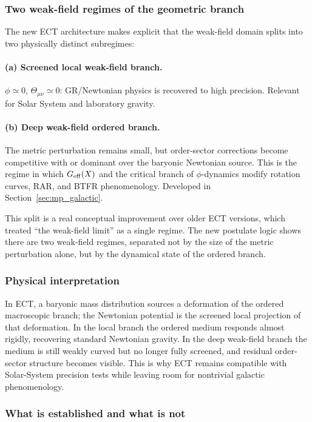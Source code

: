 \documentclass[11pt,a4paper]{article}
\numberwithin{equation}{section}
\begin{document}
\subsubsection*{Two weak-field regimes of the geometric branch}

The new ECT architecture makes explicit that the weak-field domain
splits into two physically distinct subregimes:

\paragraph{(a) Screened local weak-field branch.}
$\phi\simeq 0$, $\Theta_{\mu\nu}\simeq 0$: GR/Newtonian physics is
recovered to high precision.
Relevant for Solar System and laboratory gravity.

\paragraph{(b) Deep weak-field ordered branch.}
The metric perturbation remains small, but order-sector corrections
become competitive with or dominant over the baryonic Newtonian source.
This is the regime in which $G_{\rm eff}(X)$ and the critical branch of
$\phi$-dynamics modify rotation curves, RAR, and BTFR phenomenology.
Developed in Section~\ref{sec:mp_galactic}.

This split is a real conceptual improvement over older ECT versions,
which treated ``the weak-field limit'' as a single regime.
The new postulate logic shows there are two weak-field regimes, separated
not by the size of the metric perturbation alone, but by the dynamical
state of the ordered branch.

\subsubsection*{Physical interpretation}

In ECT, a baryonic mass distribution sources a deformation of the
ordered macroscopic branch; the Newtonian potential is the screened local
projection of that deformation.
In the local branch the ordered medium responds almost rigidly, recovering
standard Newtonian gravity.
In the deep weak-field branch the medium is still weakly curved but no
longer fully screened, and residual order-sector structure becomes
visible.
This is why ECT remains compatible with Solar-System precision tests
while leaving room for nontrivial galactic phenomenology.

\subsubsection*{What is established and what is not}
\end{document}

